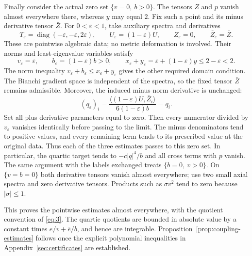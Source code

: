 Finally consider the actual zero set $\{v=0,\ b>0\}$. The tensors
$Z$ and $p$ vanish almost everywhere there, whereas $y$ may equal $2$.
Fix such a point and its minus derivative tensor $\bar Z$. For
$0<\varepsilon<1$, take auxiliary spectra and derivatives
\[
 T_\varepsilon=\operatorname{diag}(-\varepsilon,-\varepsilon,
                                    2\varepsilon),\qquad
 U_\varepsilon=(1-\varepsilon)U,\qquad
 Z_\varepsilon=0,\qquad \bar Z_\varepsilon=\bar Z.
\]
These are pointwise algebraic data; no metric deformation is involved.
Their norms and least-eigenvalue variables satisfy
\[
 v_\varepsilon=\varepsilon,\qquad
 b_\varepsilon=(1-\varepsilon)b>0,\qquad
 x_\varepsilon+y_\varepsilon
   =\varepsilon+(1-\varepsilon)y\le2-\varepsilon<2.
\]
The norm inequality $v_\varepsilon+b_\varepsilon\le
x_\varepsilon+y_\varepsilon$ gives the other required domain condition.
The Bianchi gradient space is independent of the spectra, so the fixed
tensor $\bar Z$ remains admissible. Moreover, the induced minus norm
derivative is unchanged:
\[
 (q_\varepsilon)_i
 =\frac{\langle(1-\varepsilon)U,\bar Z_i\rangle}
         {6(1-\varepsilon)b}=q_i.
\]
Set all plus derivative parameters equal to zero. Then every numerator
divided by $v_\varepsilon$ vanishes identically before passing to the
limit. The minus denominators tend to positive values, and every
remaining term tends to its prescribed value at the original data.
Thus each of the three estimates passes to this zero set. In particular,
the quartic target tends to $-c|q|^4/b$ and all cross terms with $p$
vanish. The same argument with the labels exchanged treats
$\{b=0,\ v>0\}$. On $\{v=b=0\}$ both derivative tensors vanish almost
everywhere; use two small axial spectra and zero derivative tensors.
Products such as $\sigma v^2$ tend to zero because $|\sigma|\le1$.

This proves the pointwise estimates almost everywhere, with the quotient
convention of \eqref{eq:3}. The quartic quotients are bounded in absolute
value by a constant times $e/v+\bar e/b$, and hence are integrable.
Proposition~\ref{prop:coupling-estimates} follows once the explicit
polynomial inequalities in Appendix~\ref{sec:certificates} are established.
